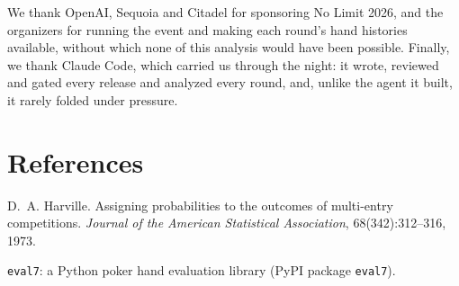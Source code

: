 \documentclass[10pt]{article}
\begin{document}
We thank OpenAI, Sequoia and Citadel for sponsoring No Limit 2026, and the organizers for running the event and making each round's hand histories available, without which none of this analysis would have been possible. Finally, we thank Claude Code, which carried us through the night: it wrote, reviewed and gated every release and analyzed every round, and, unlike the agent it built, it rarely folded under pressure.

\section*{References}
\small
\begin{enumerate}[label={[\arabic*]},leftmargin=2em]
\item D.~A. Harville. Assigning probabilities to the outcomes of multi-entry competitions. \emph{Journal of the American Statistical Association}, 68(342):312--316, 1973.
\item \texttt{eval7}: a Python poker hand evaluation library (PyPI package \texttt{eval7}).
\end{enumerate}
\end{document}
